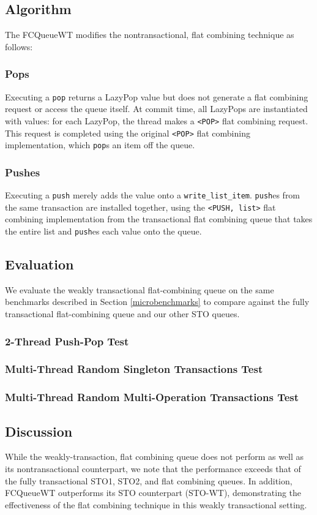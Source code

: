 \subsection{Algorithm}

The FCQueueWT modifies the nontransactional, flat combining technique as follows:
   \subsubsection{Pops} 
    Executing a \texttt{pop} returns a LazyPop value but does not generate a flat combining request or access the queue itself. At commit time, all LazyPops are instantiated with values: for each LazyPop, the thread makes a \texttt{<POP>} flat combining request. This request is completed using the original \texttt{<POP>} flat combining implementation, which \texttt{pop}s an item off the queue.

    \subsubsection{Pushes}
    Executing a \texttt{push} merely adds the value onto a \texttt{write\_list\_item}. \texttt{push}es from the same transaction are installed together, using the \texttt{<PUSH, list>} flat combining implementation from the transactional flat combining queue that takes the entire list and \texttt{push}es each value onto the queue.


\subsection{Evaluation}
%

We evaluate the weakly transactional flat-combining queue on the same benchmarks described in Section \ref{microbenchmarks} to compare against the fully transactional flat-combining queue and our other STO queues.

\subsubsection{2-Thread Push-Pop Test}

\subsubsection{Multi-Thread Random Singleton Transactions Test}

\subsubsection{Multi-Thread Random Multi-Operation Transactions Test}

\subsection{Discussion}
While the weakly-transaction, flat combining queue does not perform as well as its nontransactional counterpart, we note that the performance exceeds that of the fully transactional STO1, STO2, and flat combining queues. In addition, FCQueueWT outperforms its STO counterpart (STO-WT), demonstrating the effectiveness of the flat combining technique in this weakly transactional setting.
